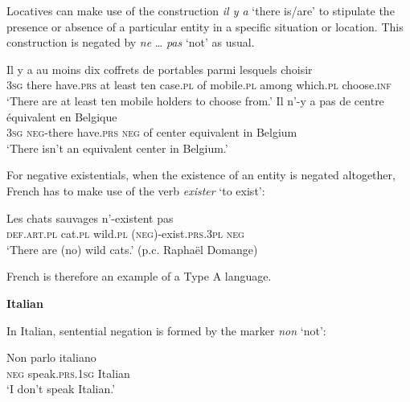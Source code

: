 \documentclass[output=paper]{langsci/langscibook}
\begin{document}
\begin{unindented}
Locatives can make use of the construction \textit{il y a} `there is\slash are' to stipulate the presence or absence of a particular entity in a specific situation or location. This construction is negated by \textit{ne} … \textit{pas} `not' as usual.
%
\begin{exe}\ex \gll
Il y a au moins dix coffrets de portables parmi lesquels choisir \\
\textsc{3sg} there have.\textsc{prs} at  least    ten case.\textsc{pl} of mobile.\textsc{pl} among which.\textsc{pl} choose.\textsc{inf} \\
    \glt `There are at least ten mobile holders to choose from.' \citep[274]{Offord2006}
\ex \gll Il n’-y a pas de centre équivalent en Belgique \\
\textsc{3sg} \textsc{neg}-there have.\textsc{prs} \textsc{neg}  of center equivalent in Belgium \\
    \glt `There isn't an equivalent center in Belgium.' \citep[208]{Offord2006}
    \end{exe}

For negative existentials, when the existence of an entity is negated altogether, French has to make use of the verb \textit{exister} `to exist':
%
\begin{exe}\ex \gll Les chats sauvages {\op}n’-{\cp}existent pas \\
\textsc{def.art.pl} cat.\textsc{pl} wild.\textsc{pl}   (\textsc{neg})-exist.\textsc{prs.3pl} \textsc{neg} \\
    \glt `There are (no) wild cats.' (p.c. Raphaël Domange)
    \end{exe}

French is therefore an example of a Type A language. 

\textbf{Italian}

In Italian, sentential negation is formed by the marker \textit{non} `not':
%
\begin{exe}\ex \gll Non parlo italiano \\
\textsc{neg} speak.\textsc{prs}.\textsc{1sg} Italian  \\
    \glt `I don't speak Italian.' \parencite[41]{PeyronelHiggins2006}
    \end{exe}


\end{unindented}
\end{document}
